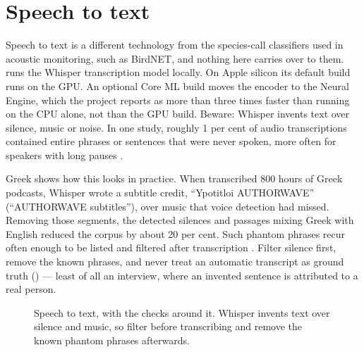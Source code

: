 \section{Speech to text}

Speech to text is a different technology from the species-call classifiers
used in acoustic monitoring, such as BirdNET, and nothing here carries over to
them.  runs the Whisper transcription model locally. On
Apple silicon its default build runs on the GPU. An optional Core ML build
moves the encoder to the Neural Engine, which the project reports as more
than three times faster than running on the CPU alone, not than the GPU
build. Beware: Whisper invents text over silence, music or noise. In one
study, roughly 1 per cent of audio transcriptions contained entire phrases or
sentences that were never spoken, more often for speakers with long pauses
\parencite{koenecke2024whisper}.

Greek shows how this looks in practice. When \textcite{paraskevopoulos2024greekpodcast}
transcribed 800 hours of Greek podcasts, Whisper wrote a subtitle credit,
``Ypotitloi AUTHORWAVE'' (``AUTHORWAVE subtitles''), over music that voice
detection had missed. Removing those segments, the detected silences and passages
mixing Greek with English reduced the corpus by about 20 per cent. Such phantom
phrases recur often enough to be listed and filtered after transcription
\parencite{baranski2025whisper}. Filter silence first, remove the known phrases,
and never treat an automatic transcript as ground truth () --- least of all an
interview, where an invented sentence is attributed to a real person.

\begin{figure}[htbp]
\centering
{}
\caption{Speech to text, with the checks around it. Whisper invents text over
silence and music, so filter before transcribing and remove the known phantom
phrases afterwards.}
\label{fig:speech}
\end{figure}

